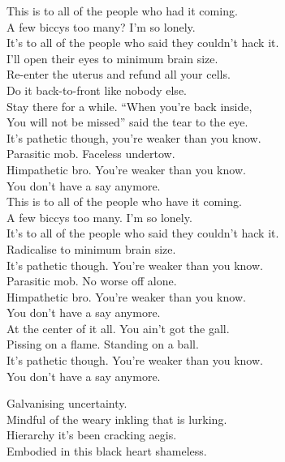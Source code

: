 This is to all of the people who had it coming. \\
A few biccys too many? I'm so lonely. \\
It's to all of the people who said they couldn't hack it. \\
I'll open their eyes to minimum brain size. \\

Re-enter the uterus and refund all your cells. \\
Do it back-to-front like nobody else. \\
Stay there for a while. ``When you're back inside, \\
You will not be missed'' said the tear to the eye. \\

It's pathetic though, you're weaker than you know. \\
Parasitic mob. Faceless undertow. \\
Himpathetic bro. You're weaker than you know. \\
You don't have a say anymore. \\

This is to all of the people who have it coming. \\
A few biccys too many. I'm so lonely. \\
It's to all of the people who said they couldn't hack it. \\
Radicalise to minimum brain size. \\

It's pathetic though. You're weaker than you know. \\
Parasitic mob. No worse off alone. \\
Himpathetic bro. You're weaker than you know. \\
You don't have a say anymore. \\

At the center of it all. You ain't got the gall. \\
Pissing on a flame. Standing on a ball. \\
It's pathetic though. You're weaker than you know. \\
You don't have a say anymore. \\




Galvanising uncertainty. \\
Mindful of the weary inkling that is lurking. \\
Hierarchy it's been cracking aegis. \\
Embodied in this black heart shameless. \\

